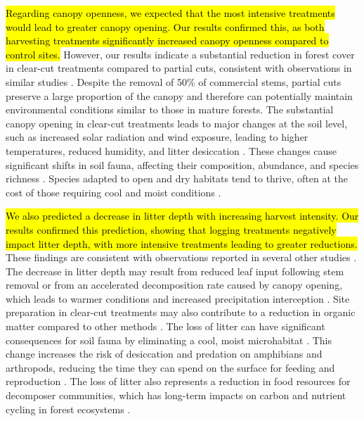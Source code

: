 \hl{Regarding canopy openness, we expected that the most intensive treatments would lead to greater canopy opening.  
Our results confirmed this, as both harvesting treatments significantly increased canopy openness compared to control sites.}
However, our results indicate a substantial reduction in forest cover in clear-cut treatments compared to partial cuts, consistent with observations in similar studies \citep{Nolet2018Comparingeffects,Mazerolle2021Woodlandsalamander}. 
Despite the removal of 50\% of commercial stems, partial cuts preserve a large proportion of the canopy and therefore can potentially maintain environmental conditions similar to those in mature forests. 
The substantial canopy opening in clear-cut treatments leads to major changes at the soil level, such as increased solar radiation and wind exposure, leading to higher temperatures, reduced humidity, and litter desiccation \citep{Keenan1993ecologicaleffects,Chen1999MicroclimateForest,Lindo2003Microbialbiomass,Brooks2008Forestfloor}. 
These changes cause significant shifts in soil fauna, affecting their composition, abundance, and species richness \citep{Staab2023Insectdecline}. 
Species adapted to open and dry habitats tend to thrive, often at the cost of those requiring cool and moist conditions \citep{Niemela2007effectsforestry,Ochs2022Responseterrestrial,Staab2023Insectdecline}.

\hl{We also predicted a decrease in litter depth with increasing harvest intensity. 
Our results confirmed this prediction, showing that logging treatments negatively impact litter depth, with more intensive treatments leading to greater reductions. }
These findings are consistent with observations reported in several other studies \citep{Marshall2000Impactsforest,Mazerolle2021Woodlandsalamander}. 
The decrease in litter depth may result from reduced leaf input following stem removal or from an accelerated decomposition rate caused by canopy opening, 
which leads to warmer conditions and increased precipitation interception \citep{Fierer2005LitterQuality,Butenschoen2011Interactiveeffects,Ameray2021Forestcarbon}. 
Site preparation in clear-cut treatments may also contribute to a reduction in organic matter compared to other methods \citep{Prevost1992Effetsscarifiage}. 
The loss of litter can have significant consequences for soil fauna by eliminating a cool, moist microhabitat \citep{spotilaRoleTemperatureWater1972,groverInfluenceCoverMoisture1998a,Niemela2007effectsforestry}. 
This change increases the risk of desiccation and predation on amphibians and arthropods, reducing the time they can spend on the surface for feeding and reproduction \citep{deMaynadier1995relationshipforest,koivula.LeafLitterSmallscale1999,Walton2013Topdownregulation}. 
The loss of litter also represents a reduction in food resources for decomposer communities, which has long-term impacts on carbon and nutrient cycling in forest ecosystems \citep{Handa2014Consequencesbiodiversity}. 

